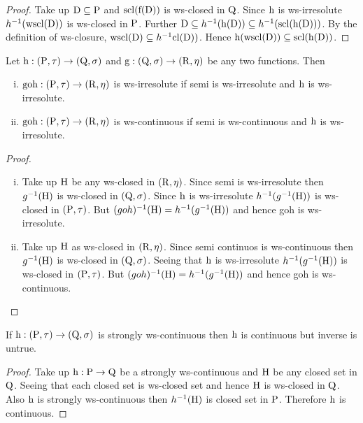 \begin{proof}
Take up $\mathrm{D}\subseteq \mathrm{P}$ and $\mathrm{scl}(\mathrm{f}(\mathrm{D}))$ is ws-closed in $\mathrm{Q}$. Since $\mathrm{h}$ is ws-irresolute $h^{-1} (\mathrm{wscl}(\mathrm{D}))$ is ws-closed in $\mathrm{P}$. Further $\mathrm{D}\subseteq  h^{-1} (\mathrm{h}(\mathrm{D})) \subseteq  h^{-1} (\mathrm{scl}(\mathrm{h}(\mathrm{D})))$. By the definition of ws-closure, $\mathrm{wscl}(\mathrm{D}) \subseteq h^{-1} \mathrm{cl}(\mathrm{D}))$. Hence $\mathrm{h}(\mathrm{wscl}(\mathrm{D}))\subseteq \mathrm{scl}(\mathrm{h}(\mathrm{D}))$.
\end{proof}

\begin{thm}\label{thm3.3.5}
Let $\mathrm{h}: (\mathrm{P}, \tau)\to (\mathrm{Q}, \sigma)$ and $\mathrm{g}: (\mathrm{Q}, \sigma )\to (\mathrm{R}, \eta)$ be any two functions. Then
\begin{enumerate}[(i)]
\item $\text{goh}: (\mathrm{P}, \tau)\to (\mathrm{R}, \eta)$ is ws-irresolute if semi is ws-irresolute and $\mathrm{h}$ is ws-irresolute.
\item $\text{goh}: (\mathrm{P}, \tau)\to (\mathrm{R}, \eta)$ is ws-continuous if semi is ws-continuous and $\mathrm{h}$ is ws-irresolute.
\end{enumerate}
\end{thm}

\begin{proof}
\begin{enumerate}[(i)]
\item Take up $\mathrm{H}$ be any ws-closed in $(\mathrm{R},\eta)$. Since semi is ws-irresolute then $g^{-1}(\mathrm{H})$ is ws-closed in $(\mathrm{Q}, \sigma)$. Since $\mathrm{h}$ is ws-irresolute $h^{-1}(g^{-1}(\mathrm{H}))$ is ws-closed in $(\mathrm{P}, \tau)$. But $(goh)^{-1} (\mathrm{H})=h^{-1}(g^{-1}(\mathrm{H}))$ and hence goh is ws-irresolute.

\item Take up $\mathrm{H}$ as ws-closed in $(\mathrm{R},\eta)$. Since semi continuos is ws-continuous then $g^{-1}(\mathrm{H})$ is ws-closed in $(\mathrm{Q}, \sigma)$. Seeing that $\mathrm{h}$ is ws-irresolute $h^{-1}(g^{-1}(\mathrm{H}))$ is ws-closed in $(\mathrm{P},\tau)$. But $(goh)^{-1} (\mathrm{H})=h^{-1} (g^{-1}(\mathrm{H}))$ and hence goh is ws-continuous.
\end{enumerate}
\end{proof}

\begin{thm}\label{thm3.3.6}
If $\mathrm{h}: (\mathrm{P},\tau)\to (\mathrm{Q}, \sigma)$ is strongly ws-continuous then $\mathrm{h}$ is continuous but inverse is untrue.
\end{thm}

\begin{proof}
Take up $\mathrm{h}: \mathrm{P}\to \mathrm{Q}$ be a strongly ws-continuous and $\mathrm{H}$ be any closed set in $\mathrm{Q}$. Seeing that each closed set is ws-closed set and hence $\mathrm{H}$ is ws-closed in $\mathrm{Q}$. Also $\mathrm{h}$ is strongly ws-continuous then $h^{-1}(\mathrm{H})$ is closed set in $\mathrm{P}$. Therefore $\mathrm{h}$ is continuous.
\end{proof}

